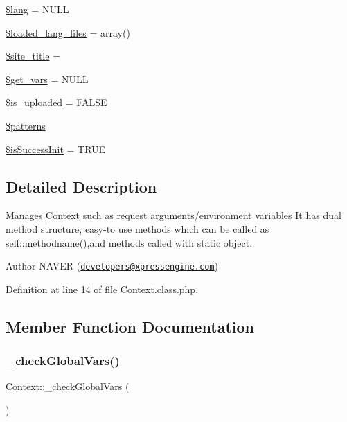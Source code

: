 \begin{DoxyCompactItemize}
\item 
\hyperlink{classContext_a0771720dad655d0c53f6f31066c67a40}{\$lang} = N\+U\+LL
\item 
\hyperlink{classContext_a0a199fec60b92b21746f1b6e93df01dc}{\$loaded\+\_\+lang\+\_\+files} = array()
\item 
\hyperlink{classContext_a3663ad0bbcb194dbb5766db96c9ecefb}{\$site\+\_\+title} = \textquotesingle{}\textquotesingle{}
\item 
\hyperlink{classContext_a587652913f4784dc8ad4a1cd4e3ee408}{\$get\+\_\+vars} = N\+U\+LL
\item 
\hyperlink{classContext_a4f8c544baae73ab83d08ec55e0c7c00d}{\$is\+\_\+uploaded} = F\+A\+L\+SE
\item 
\hyperlink{classContext_a257fa15929338411949a173ff34ab35d}{\$patterns}
\item 
\hyperlink{classContext_a342fb7b74268197dea5cadbe62aaea7a}{\$is\+Success\+Init} = T\+R\+UE
\end{DoxyCompactItemize}


\subsection{Detailed Description}
Manages \hyperlink{classContext}{Context} such as request arguments/environment variables It has dual method structure, easy-\/to use methods which can be called as self\+::methodname(),and methods called with static object.

\begin{DoxyAuthor}{Author}
N\+A\+V\+ER (\href{mailto:developers@xpressengine.com}{\tt developers@xpressengine.\+com}) 
\end{DoxyAuthor}


Definition at line 14 of file Context.\+class.\+php.



\subsection{Member Function Documentation}
\hypertarget{classContext_a8030f7c76467bfcec812be76f55571cd}{}\label{classContext_a8030f7c76467bfcec812be76f55571cd} 
\subsubsection{\texorpdfstring{\+\_\+check\+Global\+Vars()}{\_checkGlobalVars()}}
{\footnotesize\ttfamily Context\+::\+\_\+check\+Global\+Vars (\begin{DoxyParamCaption}{ }\end{DoxyParamCaption})}

